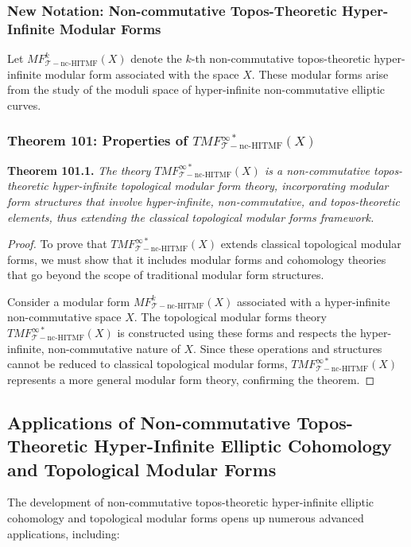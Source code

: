 \documentclass{article}
\begin{document}
\subsubsection{New Notation: Non-commutative Topos-Theoretic Hyper-Infinite Modular Forms}
Let \(MF_{\mathcal{T}-\text{nc-HITMF}}^{k}(X)\) denote the \(k\)-th non-commutative topos-theoretic hyper-infinite modular form associated with the space \(X\). These modular forms arise from the study of the moduli space of hyper-infinite non-commutative elliptic curves.

\subsubsection{Theorem 101: Properties of \(TMF_{\mathcal{T}-\text{nc-HITMF}}^{\infty *}(X)\)}
\textbf{Theorem 101.1.} \textit{The theory \(TMF_{\mathcal{T}-\text{nc-HITMF}}^{\infty *}(X)\) is a non-commutative topos-theoretic hyper-infinite topological modular form theory, incorporating modular form structures that involve hyper-infinite, non-commutative, and topos-theoretic elements, thus extending the classical topological modular forms framework.}

\begin{proof}
To prove that \(TMF_{\mathcal{T}-\text{nc-HITMF}}^{\infty *}(X)\) extends classical topological modular forms, we must show that it includes modular forms and cohomology theories that go beyond the scope of traditional modular form structures.

Consider a modular form \(MF_{\mathcal{T}-\text{nc-HITMF}}^{k}(X)\) associated with a hyper-infinite non-commutative space \(X\). The topological modular forms theory \(TMF_{\mathcal{T}-\text{nc-HITMF}}^{\infty *}(X)\) is constructed using these forms and respects the hyper-infinite, non-commutative nature of \(X\). Since these operations and structures cannot be reduced to classical topological modular forms, \(TMF_{\mathcal{T}-\text{nc-HITMF}}^{\infty *}(X)\) represents a more general modular form theory, confirming the theorem.
\end{proof}

\subsection{Applications of Non-commutative Topos-Theoretic Hyper-Infinite Elliptic Cohomology and Topological Modular Forms}
The development of non-commutative topos-theoretic hyper-infinite elliptic cohomology and topological modular forms opens up numerous advanced applications, including:
\end{document}
